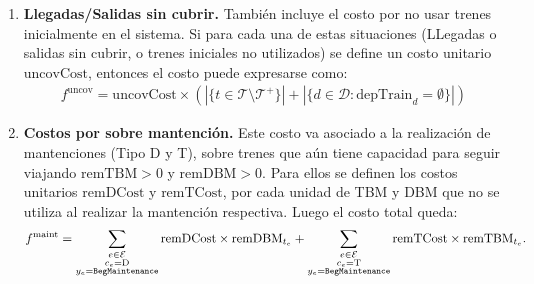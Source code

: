 \documentclass[letter, 10pt]{article}
\begin{document}
    \begin{enumerate}
        \item \textbf{Llegadas/Salidas sin cubrir.} También incluye el costo por no usar trenes inicialmente en el sistema. Si para cada una de estas situaciones (LLegadas o salidas sin cubrir, o trenes iniciales no utilizados) se define un costo unitario $\text{uncovCost}$, entonces el costo puede expresarse como:
        \begin{align*}
            f^{\text{uncov}} = \text{uncovCost} \times \left( \left| \{t \in \mathcal{T} \setminus \mathcal{T}^+\} \right| + \left| \{ d \in \mathcal{D}: \text{depTrain}_d = \emptyset \} \right| \right)
        \end{align*}
        \item \textbf{Costos por sobre mantención.} Este costo va asociado a la realización de mantenciones (Tipo D y T), sobre trenes que aún tiene capacidad para seguir viajando $\text{remTBM} > 0$ y $\text{remDBM} > 0$. Para ellos se definen los costos unitarios $\text{remDCost}$ y $\text{remTCost}$, por cada unidad de TBM y DBM que no se utiliza al realizar la mantención respectiva. Luego el costo total queda:
        \begin{align*}
            f^{\text{maint}} = \sum_{\substack{e \in \mathcal{E} \\ c_e = \text{D} \\y_e = \text{\texttt{BegMaintenance}}}} \text{remDCost}\times \text{remDBM}_{t_e} + \sum_{\substack{e \in \mathcal{E} \\ c_e = \text{T} \\y_e = \text{\texttt{BegMaintenance}}}} \text{remTCost}\times \text{remTBM}_{t_e}.
        \end{align*}


\end{enumerate}
\end{document}
